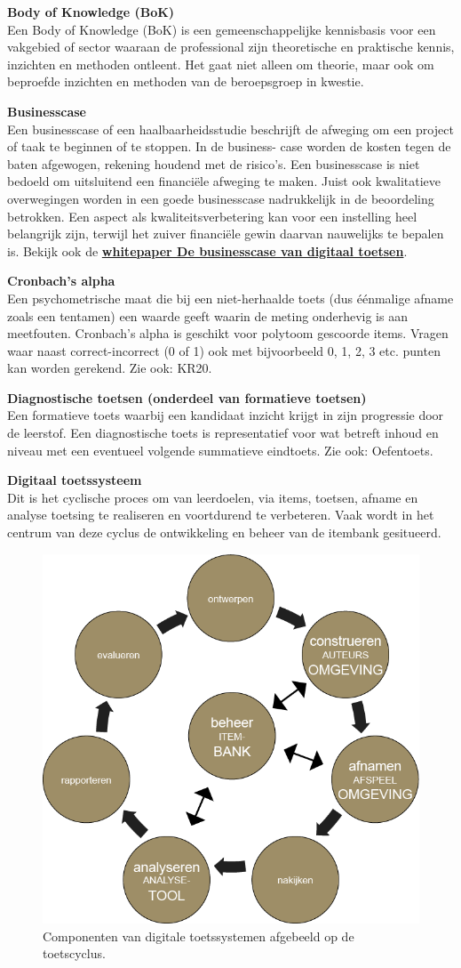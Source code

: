 \documentclass[
]{book}
\begin{document}
\textbf{Body of Knowledge (BoK)}\\
Een Body of Knowledge (BoK) is een gemeenschappelijke kennisbasis voor een vakgebied of sector waaraan de professional zijn theoretische en praktische kennis, inzichten en methoden ontleent. Het gaat niet alleen om theorie, maar ook om beproefde inzichten en methoden van de beroepsgroep in kwestie.

\textbf{Businesscase}\\
Een businesscase of een haalbaarheidsstudie beschrijft de afweging om een project of taak te beginnen of te stoppen. In de business- case worden de kosten tegen de baten afgewogen, rekening houdend met de risico's. Een businesscase is niet bedoeld om uitsluitend een financiële afweging te maken. Juist ook kwalitatieve overwegingen worden in een goede businesscase nadrukkelijk in
de beoordeling betrokken. Een aspect als kwaliteitsverbetering kan voor een instelling heel belangrijk zijn, terwijl het zuiver financiële gewin daarvan nauwelijks te bepalen is.
Bekijk ook de \textbf{\href{https://www.surf.nl/kennisbank/2014/whitepaper-de-businesscase-\%20van-digitaal-toetsen.html}{whitepaper De businesscase van digitaal toetsen}}.

\textbf{Cronbach's alpha}\\
Een psychometrische maat die bij een niet-herhaalde toets (dus éénmalige afname zoals een tentamen) een waarde geeft waarin de meting onderhevig is aan meetfouten. Cronbach's alpha is geschikt voor polytoom gescoorde items. Vragen waar naast correct-incorrect (0 of 1) ook met bijvoorbeeld 0, 1, 2, 3 etc. punten kan worden gerekend. Zie ook: KR20.

\textbf{Diagnostische toetsen (onderdeel van formatieve toetsen)}\\
Een formatieve toets waarbij een kandidaat inzicht krijgt in zijn progressie door de leerstof. Een diagnostische toets is representatief voor wat betreft inhoud en niveau met een eventueel volgende summatieve eindtoets. Zie ook: Oefentoets.

\textbf{Digitaal toetssysteem}\\
Dit is het cyclische proces om van leerdoelen, via items, toetsen, afname en analyse toetsing te realiseren en voortdurend te verbeteren. Vaak wordt in het centrum van deze cyclus de ontwikkeling en beheer van de itembank gesitueerd.

\begin{figure}
\includegraphics[width=0.4\linewidth]{images/ToetsCyclus} \caption{Componenten van digitale toetssystemen afgebeeld op de toetscyclus.}\label{fig:unnamed-chunk-10}
\end{figure}
\end{document}

